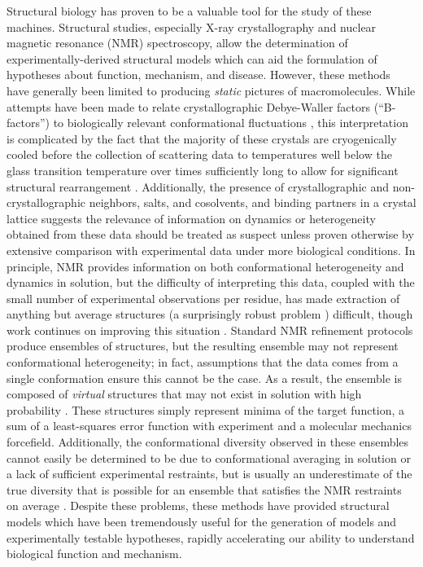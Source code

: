 Structural biology has proven to be a valuable tool for the study of these machines.
Structural studies, especially X-ray crystallography and nuclear magnetic resonance (NMR) spectroscopy, allow the determination of experimentally-derived structural models which can aid the formulation of hypotheses about function, mechanism, and disease.
However, these methods have generally been limited to producing \emph{static} pictures of macromolecules.
While attempts have been made to relate crystallographic Debye-Waller factors (``B-factors'') to biologically relevant conformational fluctuations \cite{bahar:folding-design:1997,kondrashov:biophysj:2006}, this interpretation is complicated by the fact that the majority of these crystals are cryogenically cooled before the collection of scattering data to temperatures well below the glass transition temperature \cite{weik:acta-cryst-d:2001} over times sufficiently long to allow for significant structural rearrangement \cite{kriminski:2003a}.
Additionally, the presence of crystallographic and non-crystallographic neighbors, salts, and cosolvents, and binding partners in a crystal lattice suggests the relevance of information on dynamics or heterogeneity obtained from these data should be treated as suspect unless proven otherwise by extensive comparison with experimental data under more biological conditions.
In principle, NMR provides information on both conformational heterogeneity and dynamics in solution, but the difficulty of interpreting this data, coupled with the small number of experimental observations per residue, has made extraction of anything but average structures (a surprisingly robust problem \cite{tang:1999a}) difficult, though work continues on improving this situation \cite{rieping:2005a,lindorff-larsen:2005a}.
Standard NMR refinement protocols \cite{nilges:protein-engineering:1988} produce ensembles of structures, but the resulting ensemble may not represent conformational heterogeneity; in fact, assumptions that the data comes from a single conformation ensure this cannot be the case.
As a result, the ensemble is composed of \emph{virtual} structures that may not exist in solution with high probability \cite{jardetzky:biochimica-et-biophysica-acta:1980}.
These structures simply represent minima of the target function, a sum of a least-squares error function with experiment and a molecular mechanics forcefield.
Additionally, the conformational diversity observed in these ensembles cannot easily be determined to be due to conformational averaging in solution or a lack of sufficient experimental restraints, but is usually an underestimate of the true diversity that is possible for an ensemble that satisfies the NMR restraints on average \cite{spronk:j-biomol-nmr:2003}.
Despite these problems, these methods have provided structural models which have been tremendously useful for the generation of models and experimentally testable hypotheses, rapidly accelerating our ability to understand biological function and mechanism.


